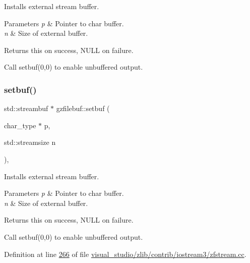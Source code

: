 Installs external stream buffer. 


\begin{DoxyParams}{Parameters}
{\em p} & Pointer to char buffer. \\
\hline
{\em n} & Size of external buffer. \\
\hline
\end{DoxyParams}
\begin{DoxyReturn}{Returns}
{\ttfamily this} on success, N\+U\+LL on failure.
\end{DoxyReturn}
Call setbuf(0,0) to enable unbuffered output. \mbox{\label{classgzfilebuf_a856bc21f7cfc6ba43f017c9c3f0d5f81}} 
\subsubsection{\texorpdfstring{setbuf()}{setbuf()}\hspace{0.1cm}{\footnotesize\ttfamily [2/2]}}
{\footnotesize\ttfamily std\+::streambuf $\ast$ gzfilebuf\+::setbuf (\begin{DoxyParamCaption}\item[{char\+\_\+type $\ast$}]{p,  }\item[{std\+::streamsize}]{n }\end{DoxyParamCaption})\hspace{0.3cm}{\ttfamily [protected]}, {\ttfamily [virtual]}}



Installs external stream buffer. 


\begin{DoxyParams}{Parameters}
{\em p} & Pointer to char buffer. \\
\hline
{\em n} & Size of external buffer. \\
\hline
\end{DoxyParams}
\begin{DoxyReturn}{Returns}
{\ttfamily this} on success, N\+U\+LL on failure.
\end{DoxyReturn}
Call setbuf(0,0) to enable unbuffered output. 

Definition at line \hyperlink{visual__studio_2zlib_2contrib_2iostream3_2zfstream_8cc_source_l00266}{266} of file \hyperlink{visual__studio_2zlib_2contrib_2iostream3_2zfstream_8cc_source}{visual\+\_\+studio/zlib/contrib/iostream3/zfstream.\+cc}.

\mbox{\label{classgzfilebuf_ad109ea4fc4ca7cc19d8014b53375255d}} 
